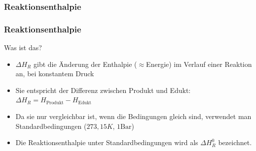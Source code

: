 \subsubsection{Reaktionsenthalpie}
\begin{frame}
	\frametitle{Reaktionsenthalpie}
	\begin{block}{Was ist das?}
	\begin{itemize}
		\item<+-> $\Delta H_R$ gibt die Änderung der Enthalpie ($\approx$Energie) im Verlauf einer Reaktion an, bei konstantem Druck
		\item<+-> Sie entspricht der Differenz zwischen Produkt und Edukt: $\Delta H_R = H_{\text{Produkt}} - H_{\text{Edukt}}$
		\item<+-> Da sie nur vergleichbar ist, wenn die Bedingungen gleich sind, verwendet man Standardbedingungen ($273,15 K$, $1 \text{Bar}$)
		\item<+-> Die Reaktionsenthalpie unter Standardbedingungen wird als $\Delta H_R^0$ bezeichnet.
	\end{itemize}
	\end{block}
\end{frame}
